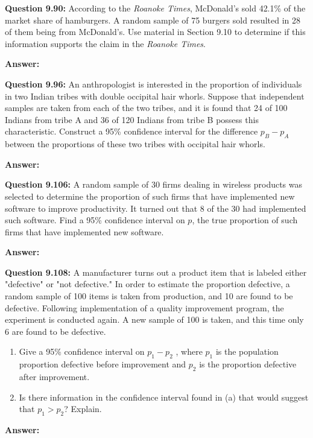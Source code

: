 \documentclass{article}
\begin{document}
\textbf{Question 9.90:}
According to the \textit{Roanoke Times}, McDonald’s
sold 42.1\% of the market share of hamburgers. A random 
sample of 75 burgers sold resulted in 28 of them
being from McDonald’s. Use material in Section 9.10
to determine if this information supports the claim in
the \textit{Roanoke Times}.
\begin{description}
    \item \textbf{Answer:} 
\end{description}

\textbf{Question 9.96:}
An anthropologist is interested in the proportion
of individuals in two Indian tribes with double 
occipital hair whorls. Suppose that independent samples are
taken from each of the two tribes, and it is found that
24 of 100 Indians from tribe A and 36 of 120 Indians
from tribe B possess this characteristic. Construct a
95\% confidence interval for the difference $p_B − p_A$ 
between the proportions of these two tribes with occipital
hair whorls.
\begin{description}
    \item \textbf{Answer:} 
\end{description}

\textbf{Question 9.106:}
A random sample of 30 firms dealing in wireless
products was selected to determine the proportion of
such firms that have implemented new software to 
improve productivity. It turned out that 8 of the 30 had
implemented such software. Find a 95\% confidence 
interval on $p$, the true proportion of such firms that have
implemented new software.
\begin{description}
    \item \textbf{Answer:} 
\end{description}

\textbf{Question 9.108:}
A manufacturer turns out a product item that
is labeled either "defective" or "not defective." In order
to estimate the proportion defective, a random sample 
of 100 items is taken from production, and 10 are
found to be defective. Following implementation of a
quality improvement program, the experiment is 
conducted again. A new sample of 100 is taken, and this
time only 6 are found to be defective.
\begin{enumerate}[label = (\alph*) ]
    \item Give a 95\% confidence interval on $p_1 − p_2$ , 
    where $p_1$ is the population proportion defective before 
    improvement and $p_2$ is the proportion defective after
    improvement.
    \item Is there information in the confidence interval
    found in (a) that would suggest that $p_1 > p_2$? 
    Explain.
\end{enumerate}
\begin{description}
    \item \textbf{Answer:} 
\end{description}
\end{document}
